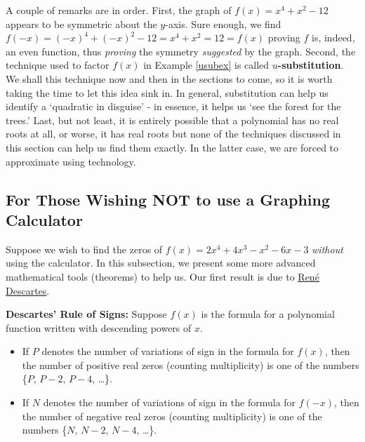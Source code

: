 A couple of remarks are in order.  First, the graph of $f(x) = x^4 + x^2 - 12$ appears to be symmetric about the $y$-axis.  Sure enough, we find $f(-x) = (-x)^4+(-x)^2  - 12 = x^4+x^2=12 = f(x)$ proving $f$ is, indeed, an even function, thus \textit{proving} the symmetry \textit{suggested} by the graph.  Second, the technique used to factor $f(x)$ in Example \ref{usubex} is called  \textbf{{\boldmath $u$}-substitution}.  We shall this technique now and then in the sections to come, so it is worth taking the time to let this idea sink in.  In general, substitution can help us identify a `quadratic in disguise' - in essence, it helps us `see the forest for the trees.'  Last, but not least, it is entirely possible that a polynomial has no real roots at all, or worse, it has real roots but none of the techniques discussed in this section can help us find them exactly.  In the latter case, we are forced to approximate using technology.  


\subsection{For Those Wishing NOT to use a Graphing Calculator}

Suppose we wish to find the zeros of $f(x) = 2x^4+4x^3-x^2-6x-3$ \textit{without} using the calculator.  In this subsection, we present some more advanced mathematical tools (theorems) to help us.  Our first result is due to \href{http://en.wikipedia.org/wiki/Descartes}{\underline{Ren\'{e} Descartes}}.

\begin{tcolorbox}

\begin{thm} \label{DRS}  \textbf{Descartes' Rule of Signs:}  Suppose $f(x)$ is the formula for a polynomial function written with descending powers of $x$.

\begin{itemize}

\item If $P$ denotes the number of variations of sign in the formula for $f(x)$, then the number of positive real zeros (counting multiplicity) is one of the numbers \{$P$, $P-2$, $P-4$, \ldots \}.

\item If $N$ denotes the number of variations of sign in the formula for $f(-x)$, then the number of negative real zeros (counting multiplicity) is one of the numbers \{$N$, $N-2$, $N-4$, \dots\}.

\end{itemize}

\end{thm}
\end{tcolorbox}

